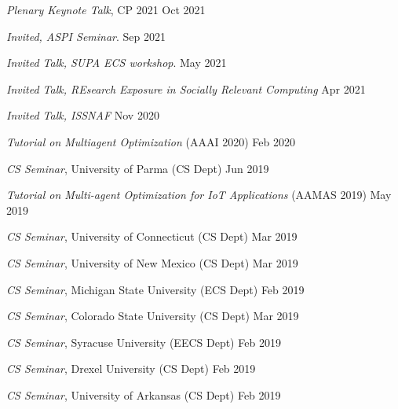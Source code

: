 
\beginList
	\item {\it Plenary Keynote Talk}, CP 2021 
	\hfill {Oct 2021}

	\item {\it Invited, ASPI Seminar}.
	\hfill {Sep 2021}

	\item {\it Invited Talk, SUPA ECS workshop}.
	\hfill {May 2021}

	\item {\it Invited Talk, REsearch Exposure in Socially Relevant Computing}
	\hfill {Apr 2021}

	\item {\it Invited Talk, ISSNAF}
	\hfill {Nov 2020}

	\item {\it Tutorial on Multiagent Optimization} (AAAI 2020)
	\hfill {Feb 2020}

	\item {\it CS Seminar}, University of Parma (CS Dept)
	\hfill {Jun 2019}

	\item {\it Tutorial on Multi-agent Optimization for IoT Applications} (AAMAS 2019)
	\hfill {May 2019}

	\item {\it CS Seminar}, University of Connecticut (CS Dept)
	\hfill {Mar 2019}

	\item {\it CS Seminar}, University of New Mexico (CS Dept)
	\hfill {Mar 2019}

	\item {\it CS Seminar}, Michigan State University (ECS Dept)
	\hfill {Feb 2019}

	\item {\it CS Seminar}, Colorado State University (CS Dept)
	\hfill {Mar 2019}

	\item {\it CS Seminar}, Syracuse University (EECS Dept)
	\hfill {Feb 2019}

	\item {\it CS Seminar}, Drexel University (CS Dept)
	\hfill {Feb 2019}

	\item {\it CS Seminar}, University of Arkansas (CS Dept)
	\hfill {Feb 2019}

